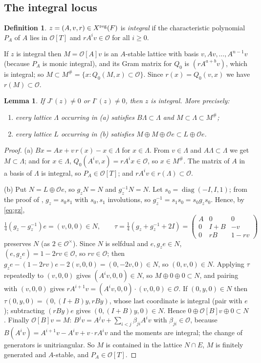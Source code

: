 \documentclass[11pt,oneside,notitlepage]{book}
\numberwithin{equation}{section}
\theoremstyle{plain}
\newtheorem{lemma}[theorem]{Lemma}
\theoremstyle{definition}
\newtheorem{definition}[theorem]{Definition}
\newcommand{\cO}{\mathcal{O}}
\newcommand{\diag}{\operatorname{diag}}
\begin{document}
\subsection*{The integral locus}

\begin{definition}
$z=(A,v,r)\in X^{\rm reg}(F)$ is \emph{integral} if the characteristic polynomial $P_A$ of $A$ lies in $\cO[T]$ and $rA^iv\in\cO$ for all $i\ge0$.
\end{definition}

If $z$ is integral then $M=\cO[A]v$ is an $A$-stable lattice with basis $v,Av,\dots,A^{n-1}v$ (because $P_A$ is monic integral), and its Gram matrix for $Q_0$ is $(rA^{a+b}v)$, which is integral; so $M\subset M^\#=\{x:Q_0(M,x)\subset\cO\}$. Since $r(x)=Q_0(v,x)$ we have $r(M)\subset\cO$.

\begin{lemma}\label{lem:integral}
If $J^\circ(z)\ne0$ or $I^\circ(z)\ne0$, then $z$ is integral. More precisely:
\begin{enumerate}[label=(\alph*)]
\item every lattice $\Lambda$ occurring in (a) satisfies $B\Lambda\subset\Lambda$ and $M\subset\Lambda\subset M^\#$;
\item every lattice $L$ occurring in (b) satisfies $M\oplus M\oplus\cO e\subset L\oplus\cO e$.
\end{enumerate}
\end{lemma}
\begin{proof}
(a) $Bx=Ax+v\,r(x)-x\in\Lambda$ for $x\in\Lambda$. From $v\in\Lambda$ and $A\Lambda\subset\Lambda$ we get $M\subset\Lambda$; and for $x\in\Lambda$, $Q_0(A^iv,x)=rA^ix\in\cO$, so $x\in M^\#$. The matrix of $A$ in a basis of $\Lambda$ is integral, so $P_A\in\cO[T]$; and $rA^iv\in r(\Lambda)\subset\cO$.

(b) Put $N=L\oplus\cO e$, so $g_zN=N$ and $g_z^{-1}N=N$. Let $s_0=\diag(-I,I,1)$; from the proof of , $g_z=s_0s_1$ with $s_0,s_1$ involutions, so $g_z^{-1}=s_1s_0=s_0g_zs_0$. Hence, by \eqref{eq:gz},
\[\tfrac14(g_z-g_z^{-1})e=(v,0,0)\in N,\qquad \tau=\tfrac14(g_z+g_z^{-1}+2I)=\begin{pmatrix}A&0&0\\0&I+B&-v\\0&rB&1-rv\end{pmatrix}\]
preserves $N$ (as $2\in\cO^\times$). Since $N$ is selfdual and $e,g_ze\in N$, $(e,g_ze)=1-2rv\in\cO$, so $rv\in\cO$; then $g_ze-(1-2rv)e-2(v,0,0)=(0,-2v,0)\in N$, so $(0,v,0)\in N$. Applying $\tau$ repeatedly to $(v,0,0)$ gives $(A^iv,0,0)\in N$, so $M\oplus0\oplus0\subset N$, and pairing with $(v,0,0)$ gives $rA^{i+1}v=(A^iv,0,0)\cdot(v,0,0)\in\cO$. If $(0,y,0)\in N$ then $\tau(0,y,0)=(0,(I+B)y,rBy)$, whose last coordinate is integral (pair with $e$); subtracting $(rBy)e$ gives $(0,(I+B)y,0)\in N$. Hence $0\oplus\cO[B]v\oplus0\subset N$. Finally $\cO[B]v=M$: $B^jv=A^jv+\sum_{i<j}\beta_{ji}A^iv$ with $\beta_{ji}\in\cO$, because $B(A^iv)=A^{i+1}v-A^iv+v\cdot rA^iv$ and the moments are integral; the change of generators is unitriangular. So $M$ is contained in the lattice $N\cap E$, $M$ is finitely generated and $A$-stable, and $P_A\in\cO[T]$.
\end{proof}
\end{document}
